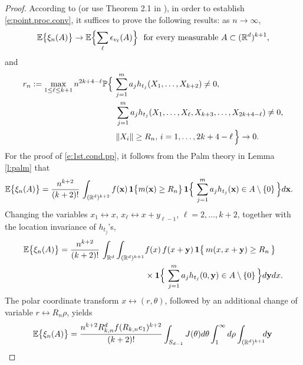 \documentclass[11pt]{amsart}
\numberwithin{equation}{section}
\theoremstyle{plain}
\theoremstyle{definition}
\begin{document}
\begin{proof}
According to \cite{decreusefond:schulte:thaele:2015} (or use Theorem 2.1 in \cite{owada:adler:2016}), in order to establish \eqref{e:point.proc.conv}, it suffices to prove the following results: as $n\to\infty$,
\begin{equation}  \label{e:1st.cond.pp}
{\mathbb{E}} \bigl\{ \xi_n(A) \bigr\} \to {\mathbb{E}} \Bigl\{ \sum_\ell \epsilon_{v_\ell}(A) \Bigr\} \ \ \text{for every measurable } A \subset ({{\mathbb R}}^d)^{k+1},
\end{equation}
and
\begin{align}
r_n := \max_{1 \leq \ell \leq k+1} n^{2k+4-\ell} {\mathbb{P}} &\Bigl\{ \ \sum_{j=1}^m a_j h_{t_j}(X_1,\dots,X_{k+2}) \neq 0, \label{e:2nd.cond.pp} \\
&\quad \sum_{j=1}^m a_j h_{t_j}(X_1,\dots,X_\ell, X_{k+3}, \dots, X_{2k+4-\ell}) \neq 0, \notag \\
&\quad \|X_i \| \geq R_n, \, i=1,\dots,2k+4-\ell\, \Bigr\} \to 0. \notag
\end{align}
For the proof of \eqref{e:1st.cond.pp}, it follows from the Palm theory in Lemma \ref{l:palm} that
\begin{align*}
{\mathbb{E}} \bigl\{ \xi_n(A) \bigr\} &= \frac{n^{k+2}}{(k+2)!}\, \int_{({{\mathbb R}}^d)^{k+2}} f({{\bf x}})\, {{\bf 1}} \bigl\{ m({{\bf x}}) \geq R_n \bigr\}\, {{\bf 1}} \Bigl\{ \ \sum_{j=1}^m a_j h_{t_j}({{\bf x}}) \in A \setminus \{ 0 \}\, \Bigr\} d{{\bf x}}.
\end{align*}
Changing the variables $x_1 \leftrightarrow x$, $x_\ell \leftrightarrow x+y_{\ell-1}$, $\ell = 2,\dots,k+2$, together with the location invariance of $h_{t_j}$'s,
\begin{align}
{\mathbb{E}} \bigl\{ \xi_n(A) \bigr\} = \frac{n^{k+2}}{(k+2)!}\, \int_{{{\mathbb R}}^d}\int_{({{\mathbb R}}^d)^{k+1}} &f(x)\, f(x+{{\bf y}})\, {{\bf 1}} \bigl\{ \,m(x,x+{{\bf y}}) \geq R_n\, \bigr\} \label{e:1st.change} \\
&\times {{\bf 1}} \Bigl\{ \ \sum_{j=1}^m a_j h_{t_j}(0, {{\bf y}}) \in A \setminus \{ 0 \}\, \Bigr\} d{{\bf y}} dx. \notag
\end{align}
The polar coordinate transform $x \leftrightarrow (r,\theta)$, followed by an additional change of variable $r \leftrightarrow R_n\rho$, yields
\begin{align}
{\mathbb{E}} \bigl\{ \xi_n(A) \bigr\} &= \frac{n^{k+2}R_{k,n}^df(R_{k,n}e_1)^{k+2}}{(k+2)!} \int_{S_{d-1}} J(\theta) d\theta \int_1^{\infty} d\rho \int_{({{\mathbb R}}^d)^{k+1}} \hspace{-5pt} d{{\bf y}} \,  \label{e:polar1} \\

\end{align}
\end{proof}
\end{document}
